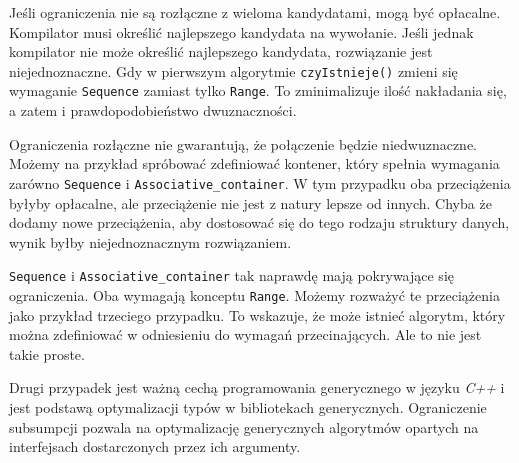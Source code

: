 \documentclass[11pt, a4paper]{article}
\begin{document}
Jeśli ograniczenia nie są rozłączne z wieloma kandydatami, mogą być opłacalne. Kompilator musi określić najlepszego kandydata na wywołanie. Jeśli jednak kompilator nie może określić najlepszego kandydata, rozwiązanie jest niejednoznaczne. Gdy w pierwszym algorytmie \verb#czyIstnieje()# zmieni się wymaganie \verb#Sequence# zamiast tylko \verb#Range#. To zminimalizuje ilość nakładania się, a zatem i prawdopodobieństwo dwuznaczności.

Ograniczenia rozłączne nie gwarantują, że połączenie będzie niedwuznaczne. Możemy na przykład spróbować zdefiniować kontener, który spełnia wymagania zarówno \verb#Sequence# i \verb#Associative_container#. W tym przypadku oba przeciążenia byłyby opłacalne, ale przeciążenie nie jest z natury lepsze od innych. Chyba że dodamy nowe przeciążenia, aby dostosować się do tego rodzaju struktury danych, wynik byłby niejednoznacznym rozwiązaniem.

\verb#Sequence# i \verb#Associative_container# tak naprawdę mają pokrywające się ograniczenia. Oba wymagają konceptu \verb#Range#. Możemy rozważyć te przeciążenia jako przykład trzeciego przypadku. To wskazuje, że może istnieć algorytm, który można zdefiniować w odniesieniu do wymagań przecinających. Ale to nie jest takie proste.

Drugi przypadek jest ważną cechą programowania generycznego w języku \emph{C++} i jest podstawą optymalizacji typów w bibliotekach generycznych. Ograniczenie subsumpcji pozwala na optymalizację generycznych algorytmów opartych na interfejsach dostarczonych przez ich argumenty.
\end{document}
